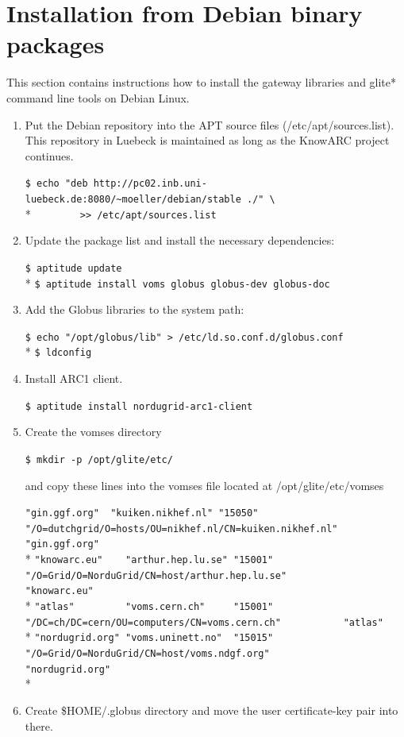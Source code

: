 \documentclass{article}
\begin{document}
\section{Installation from Debian binary packages}
\label{Debian install}
This section contains instructions how to install the gateway libraries and glite* command line tools on Debian Linux.
\begin{enumerate}
\item Put the Debian repository into the APT source files (/etc/apt/sources.list). This repository in Luebeck is maintained as long as the KnowARC project continues.
\begin{shaded}\verb#$ echo "deb http://pc02.inb.uni-luebeck.de:8080/~moeller/debian/stable ./" \#\\*
\verb#        >> /etc/apt/sources.list #\end{shaded}
\item Update the package list and install the necessary dependencies:
\begin{shaded}\verb#$ aptitude update#\\*
\verb#$ aptitude install voms globus globus-dev globus-doc#\end{shaded}
\item Add the Globus libraries to the system path:
\begin{shaded}\verb#$ echo "/opt/globus/lib" > /etc/ld.so.conf.d/globus.conf#\\*
\verb#$ ldconfig#\end{shaded}
\item Install ARC1 client.
\begin{shaded}\verb#$ aptitude install nordugrid-arc1-client#\end{shaded}
\item Create the vomses directory
\begin{shaded}\verb#$ mkdir -p /opt/glite/etc/#\end{shaded}
and copy these lines into the vomses file located at /opt/glite/etc/vomses
\begin{footnotesize}
\begin{shaded}
\verb#"gin.ggf.org"  "kuiken.nikhef.nl" "15050" "/O=dutchgrid/O=hosts/OU=nikhef.nl/CN=kuiken.nikhef.nl" "gin.ggf.org"#\\*
\verb#"knowarc.eu"    "arthur.hep.lu.se" "15001" "/O=Grid/O=NorduGrid/CN=host/arthur.hep.lu.se"          "knowarc.eu"#\\*
\verb#"atlas"         "voms.cern.ch"     "15001" "/DC=ch/DC=cern/OU=computers/CN=voms.cern.ch"           "atlas"#\\*
\verb#"nordugrid.org" "voms.uninett.no"  "15015" "/O=Grid/O=NorduGrid/CN=host/voms.ndgf.org"          "nordugrid.org"#\\*
\end{shaded}
\end{footnotesize}
\item Create \$HOME/.globus directory and move the user certificate-key pair into there.
\end{enumerate}

\end{document}
